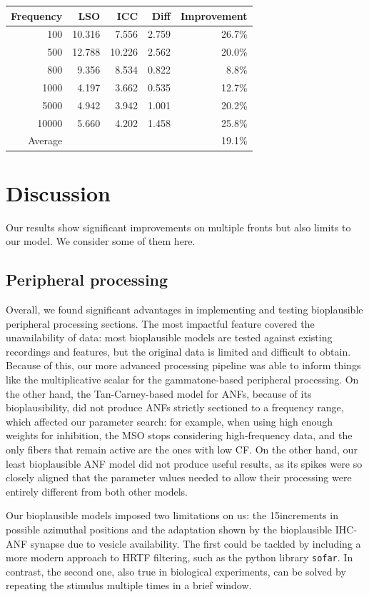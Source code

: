 \documentclass[11pt,a4paper]{article}
\begin{document}
\begin{table}[htbp]
\begin{tabular}{r|rrr|r}
\hline
Frequency & LSO & ICC & Diff & Improvement \\
\hline
100 & 10.316 & 7.556 & 2.759 & 26.7\% \\
500 & 12.788 & 10.226 & 2.562 & 20.0\% \\
800 & 9.356 & 8.534 & 0.822 & 8.8\% \\
1000 & 4.197 & 3.662 & 0.535 & 12.7\% \\
5000 & 4.942 & 3.942 & 1.001 & 20.2\% \\
10000 & 5.660 & 4.202 & 1.458 & 25.8\% \\
\hline
Average & & & & 19.1\% \\
\hline
\end{tabular}
\end{table}

\newpage
\section{Discussion}
Our results show significant improvements on multiple fronts but also limits to our model. We consider some of them here.

\subsection{Peripheral processing}
Overall, we found significant advantages in implementing and testing bioplausible peripheral processing sections. The most impactful feature covered the unavailability of data: most bioplausible models are tested against existing recordings and features, but the original data is limited and difficult to obtain. Because of this, our more advanced processing pipeline was able to inform things like the multiplicative scalar for the gammatone-based peripheral processing. On the other hand, the Tan-Carney-based model for ANFs, because of its bioplausibility, did not produce ANFs strictly sectioned to a frequency range, which affected our parameter search: for example, when using high enough weights for inhibition, the MSO stops considering high-frequency data, and the only fibers that remain active are the ones with low CF. On the other hand, our least bioplausible ANF model did not produce useful results, as its spikes were so closely aligned that the parameter values needed to allow their processing were entirely different from both other models.

Our bioplausible models imposed two limitations on us: the 15\degree increments in possible azimuthal positions and the adaptation shown by the bioplausible IHC-ANF synapse due to vesicle availability. The first could be tackled by including a more modern approach to HRTF filtering, such as the python library \lstinline{sofar}. In contrast, the second one, also true in biological experiments, can be solved by repeating the stimulus multiple times in a brief window.
\end{document}
